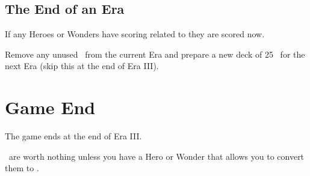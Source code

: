\documentclass[10pt,twocolumn]{article}
\begin{document}
\subsection{The End of an Era}
If any Heroes or Wonders have scoring related to  they are scored now.

Remove any unused \landcards\ from the current Era and prepare a new deck of 25 \landcards\ for the next Era (skip this at the end of Era III).

\section{Game End}
The game ends at the end of Era III.

\goods\ are worth nothing unless you have a Hero or Wonder that allows you to convert them to \vps.
\end{document}
